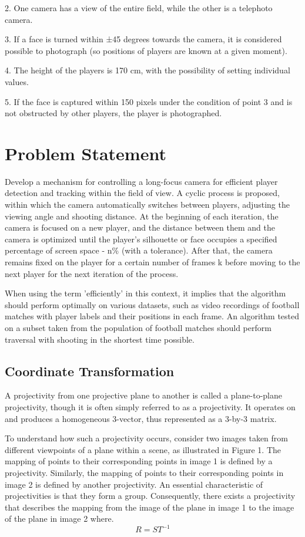 2. One camera has a view of the entire field, while the other is a telephoto camera.

3. If a face is turned within ±45 degrees towards the camera, it is considered possible to photograph (so positions of players are known at a given moment).

4. The height of the players is 170 cm, with the possibility of setting individual values.

5. If the face is captured within 150 pixels under the condition of point 3 and is not obstructed by other players, the player is photographed.

\section{Problem Statement}

Develop a mechanism for controlling a long-focus camera for efficient player detection and tracking within the field of view. A cyclic process is proposed, within which the camera automatically switches between players, adjusting the viewing angle and shooting distance. At the beginning of each iteration, the camera is focused on a new player, and the distance between them and the camera is optimized until the player's silhouette or face occupies a specified percentage of screen space - n\% (with a tolerance). After that, the camera remains fixed on the player for a certain number of frames k before moving to the next player for the next iteration of the process.

When using the term 'efficiently' in this context, it implies that the algorithm should perform optimally on various datasets, such as video recordings of football matches with player labels and their positions in each frame. An algorithm tested on a subset taken from the population of football matches should perform traversal with shooting in the shortest time possible.

\subsection{Coordinate Transformation}
A projectivity from one projective plane to another is called a plane-to-plane projectivity, though it is often simply referred to as a projectivity. It operates on and produces a homogeneous 3-vector, thus represented as a 3-by-3 matrix.

To understand how such a projectivity occurs, consider two images taken from different viewpoints of a plane within a scene, as illustrated in Figure 1. The mapping of points to their corresponding points in image 1 is defined by a projectivity. Similarly, the mapping of points to their corresponding points in image 2 is defined by another projectivity. An essential characteristic of projectivities is that they form a group. Consequently, there exists a projectivity that describes the mapping from the image of the plane in image 1 to the image of the plane in image 2 where.
$$ R = ST^{-1}$$

